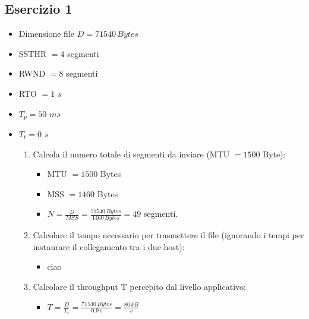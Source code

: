 \documentclass[10pt]{article}
\begin{document}
	\subsection{Esercizio 1}
	\begin{itemize}
	\item
	Dimensione file $D = 71540 \,Bytes$	
	\item
	SSTHR $= 4$ segmenti
	\item
	RWND $= 8$ segmenti
	\item
	RTO $= 1$ $s$
	\item
	$T_p = 50$ $ms$
	\item
	$T_t = 0$ $s$ 
		\begin{enumerate}
		\item
		Calcola il numero totale di segmenti da inviare (MTU $= 1500$ Byte):
			\begin{itemize}
			\item
			MTU $= 1500$ Bytes
			\item
			MSS $= 1460$ Bytes
			\item
			$N = \displaystyle{\frac{D}{MSS} = \frac{71540 \,Bytes}{1460 \,Bytes} = 49}$ segmenti.
		\end{itemize}
		\item
		Calcolare il tempo necessario per trasmettere il file (ignorando i tempi per instaurare il collegamento tra i due host):
			\begin{itemize}
			\item
			ciao
			\end{itemize}
		\item
		Calcolare il throughput T percepito dal livello applicativo:
			\begin{itemize}
			\item
			$T = \displaystyle{\frac{D}{T_r} = \frac{71540\,Bytes}{0.9\,s} = \frac{80\,kB}{s}}$ 
			\end{itemize}
		\end{enumerate}
	\end{itemize}
\end{document}

